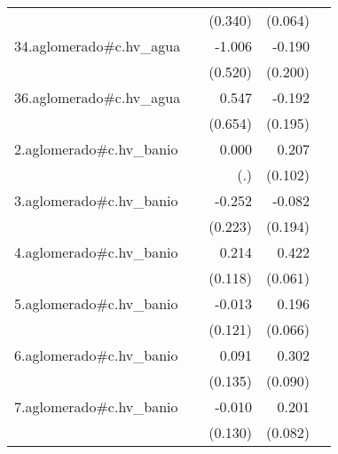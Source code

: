 {\begin{longtable}{l*{4}{D{.}{.}{-1}}}
            &                     &     (0.340)         &     (0.064)         &                     \\
\addlinespace
34.aglomerado#c.hv\_agua&                     &      -1.006         &      -0.190         &                     \\
            &                     &     (0.520)         &     (0.200)         &                     \\
\addlinespace
36.aglomerado#c.hv\_agua&                     &       0.547         &      -0.192         &                     \\
            &                     &     (0.654)         &     (0.195)         &                     \\
\addlinespace
2.aglomerado#c.hv\_banio&                     &       0.000         &       0.207\sym{*}  &                     \\
            &                     &         (.)         &     (0.102)         &                     \\
\addlinespace
3.aglomerado#c.hv\_banio&                     &      -0.252         &      -0.082         &                     \\
            &                     &     (0.223)         &     (0.194)         &                     \\
\addlinespace
4.aglomerado#c.hv\_banio&                     &       0.214         &       0.422\sym{***}&                     \\
            &                     &     (0.118)         &     (0.061)         &                     \\
\addlinespace
5.aglomerado#c.hv\_banio&                     &      -0.013         &       0.196\sym{**} &                     \\
            &                     &     (0.121)         &     (0.066)         &                     \\
\addlinespace
6.aglomerado#c.hv\_banio&                     &       0.091         &       0.302\sym{***}&                     \\
            &                     &     (0.135)         &     (0.090)         &                     \\
\addlinespace
7.aglomerado#c.hv\_banio&                     &      -0.010         &       0.201\sym{*}  &                     \\
            &                     &     (0.130)         &     (0.082)         &                     \\

\end{longtable}}
